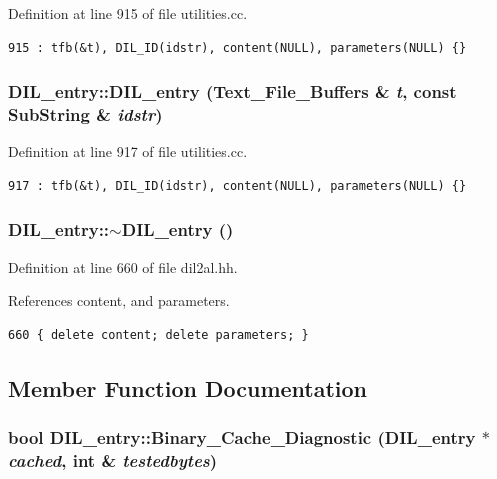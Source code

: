 Definition at line 915 of file utilities.cc.



\footnotesize\begin{verbatim}915 : tfb(&t), DIL_ID(idstr), content(NULL), parameters(NULL) {}
\end{verbatim}\normalsize 
{}
\subsubsection{\setlength{\rightskip}{0pt plus 5cm}DIL\_\-entry::DIL\_\-entry ({\bf Text\_\-File\_\-Buffers} \& {\em t}, const {\bf Sub\-String} \& {\em idstr})}\label{classDIL__entry_a2}




Definition at line 917 of file utilities.cc.



\footnotesize\begin{verbatim}917 : tfb(&t), DIL_ID(idstr), content(NULL), parameters(NULL) {}
\end{verbatim}\normalsize 
{}
\subsubsection{\setlength{\rightskip}{0pt plus 5cm}DIL\_\-entry::$\sim$DIL\_\-entry ()\hspace{0.3cm}{\tt  [inline]}}\label{classDIL__entry_a3}




Definition at line 660 of file dil2al.hh.

References content, and parameters.



\footnotesize\begin{verbatim}660 { delete content; delete parameters; }
\end{verbatim}\normalsize 


\subsection{Member Function Documentation}
\subsubsection{\setlength{\rightskip}{0pt plus 5cm}bool DIL\_\-entry::Binary\_\-Cache\_\-Diagnostic (DIL\_\-entry $\ast$ {\em cached}, int \& {\em testedbytes})}\label{classDIL__entry_a26}




